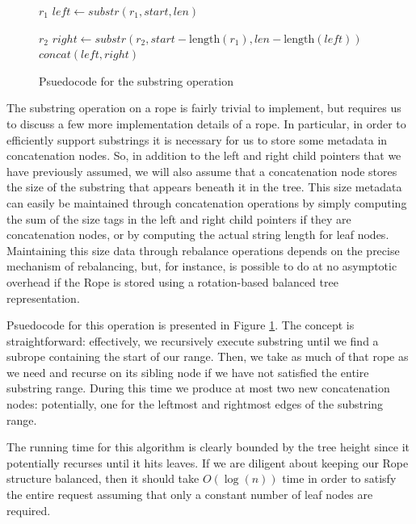 \documentclass[12pt]{article}
\begin{document}
\begin{figure}[t]
\begin{algorithmic}
  \State \Return $r_1$
  \Else
  \State $left \gets substr(r_1, start, len)$
  \EndIf

  \State \Return $r_2$
  \Else
  \State $right \gets substr(r_2, start - \text{length}(r_1), len - \text{length}(left))$
  \EndIf
  \State \Return $concat(left, right)$
  \EndFunction
\end{algorithmic}
\caption{Psuedocode for the substring operation}\label{substring}
\end{figure}


The substring operation on a rope is fairly trivial to implement, but requires us to discuss a few more implementation details of a rope. In particular, in order to efficiently support substrings it is necessary for us to store some metadata in concatenation nodes. So, in addition to the left and right child pointers that we have previously assumed, we will also assume that a concatenation node stores the size of the substring that appears beneath it in the tree. This size metadata can easily be maintained through concatenation operations by simply computing the sum of the size tags in the left and right child pointers if they are concatenation nodes, or by computing the actual string length for leaf nodes. Maintaining this size data through rebalance operations depends on the precise mechanism of rebalancing, but, for instance, is possible to do at no asymptotic overhead if the Rope is stored using a rotation-based balanced tree representation.

Psuedocode for this operation is presented in Figure \ref{substring}. The concept is straightforward: effectively, we recursively execute substring until we find a subrope containing the start of our range. Then, we take as much of that rope as we need and recurse on its sibling node if we have not satisfied the entire substring range. During this time we produce at most two new concatenation nodes: potentially, one for the leftmost and rightmost edges of the substring range.

The running time for this algorithm is clearly bounded by the tree height since it potentially recurses until it hits leaves. If we are diligent about keeping our Rope structure balanced, then it should take $O(\log(n))$ time in order to satisfy the entire request assuming that only a constant number of leaf nodes are required.
\end{document}

